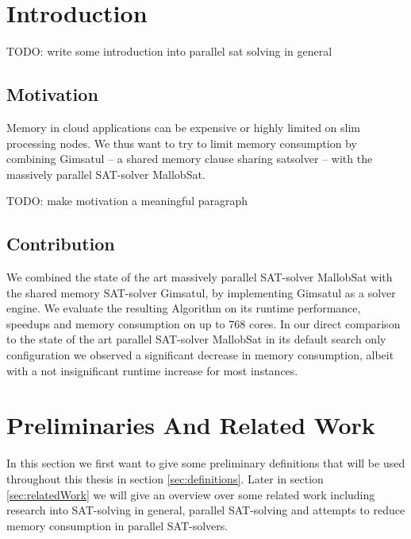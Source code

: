 \documentclass[12pt,a4paper,twoside]{scrartcl}
\numberwithin{equation}{section}
\begin{document}
\tableofcontents

\clearpage


\listoffigures
\listoftables

\clearpage


\section{Introduction}

TODO: write some introduction into parallel sat solving in general

\subsection{Motivation}

Memory in cloud applications can be expensive or highly limited on slim processing nodes. We thus want to try to limit memory consumption by combining Gimsatul -- a shared memory clause sharing satsolver -- with the massively parallel SAT-solver MallobSat.


TODO: make motivation a meaningful paragraph

\subsection{Contribution}

We combined the state of the art massively parallel SAT-solver MallobSat with the shared memory SAT-solver Gimsatul, by implementing Gimsatul as a solver engine. We evaluate the resulting Algorithm on its runtime performance, speedups and memory consumption on up to 768 cores. In our direct comparison to the state of the art parallel SAT-solver MallobSat in its default search only configuration we observed a significant decrease in memory consumption, albeit with a not insignificant runtime increase for most instances.


\section{Preliminaries And Related Work}

In this section we first want to give some preliminary definitions that will be used throughout this thesis in section \ref{sec:definitions}. Later in section \ref{sec:relatedWork} we will give an overview over some related work including research into SAT-solving in general, parallel SAT-solving and attempts to reduce memory consumption in parallel SAT-solvers.
\end{document}

